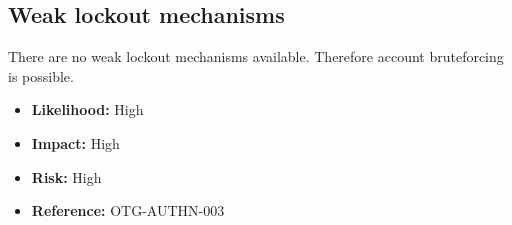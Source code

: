 \subsection{Weak lockout mechanisms}
There are no weak lockout mechanisms available. Therefore account bruteforcing is possible.
\begin{itemize}
	\item \textbf{Likelihood:} High
	\item \textbf{Impact:} High
	\item \textbf{Risk:} High
	\item \textbf{Reference:} OTG-AUTHN-003
\end{itemize}